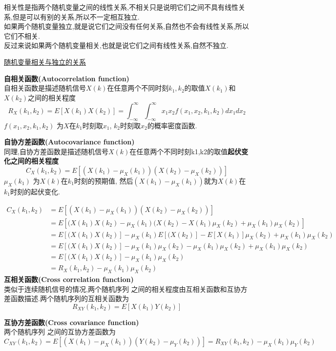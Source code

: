 \documentclass{article}
\begin{document}
相关性是指两个随机变量之间的线性关系,不相关只是说明它们之间不具有线性关系,但是可以有别的关系,所以不一定相互独立.\\
如果两个随机变量独立,就是说它们之间没有任何关系,自然也不会有线性关系,所以它们不相关.\\
反过来说如果两个随机变量相关,也就是说它们之间有线性关系,自然不独立.

\href{http://www.cppblog.com/sosi/archive/2010/09/20/127151.html}{随机变量相关与独立的关系}

\textbf{自相关函数(Autocorrelation function)}\\
自相关函数是描述随机信号$X(k)$在任意两个不同时刻$k_1,k_2$的取值$X(k_1) $和$X(k_2) $之间的相关程度
$$
R_X(k_1, k_2)
= E[X(k_1) X(k_2)]
= \int_{-\infty}^{\infty} \int_{-\infty}^{\infty} x_1 x_2 f(x_1, x_2, k_1, k_2)dx_1 dx_2
$$
$f(x_1, x_2, k_1, k_2)$ 为$X$在$k_1$时刻取$x_1$, $k_2$时刻取$x_2$的概率密度函数.

\textbf{自协方差函数(Autocovariance function)}\\
同理,自协方差函数是描述随机信号$X(k)$在任意两个不同时刻k1,k2的取值\textbf{起伏变化之间的相关程度}
$$ C_X(k_1,k_2) = E[(X(k_1) - \mu_X(k_1)) (X(k_2) - \mu_X(k_2))] $$
$\mu_X(k_1)$ 为$X(k)$在$k_1$时刻的预期值, 然后$(X(k_1) - \mu_X(k_1))$就为$X(k)$在$k_1$时刻的起伏变化.

$$
\begin{aligned}
C_X(k_1,k_2)
& = E[(X(k_1) - \mu_X(k_1)) (X(k_2) - \mu_X(k_2))] \\
& = E[(X(k_1) X(k_2) - \mu_X(k_1)(X(k_2) - X(k_1)\mu_X(k_2) + \mu_X(k_1) \mu_X(k_2)] \\
& = E[(X(k_1) X(k_2)] - \mu_X(k_1)E[(X(k_2)] - E[X(k_1)]\mu_X(k_2) + \mu_X(k_1) \mu_X(k_2) \\
& = E[(X(k_1) X(k_2)] - \mu_X(k_1) \mu_X(k_2) - \mu_X(k_1) \mu_X(k_2) + \mu_X(k_1) \mu_X(k_2) \\
& = E[(X(k_1) X(k_2)] - \mu_X(k_1) \mu_X(k_2)\\
& = R_X(k_1, k_2) - \mu_X(k_1) \mu_X(k_2)
\end{aligned}
$$
\textbf{互相关函数(Cross correlation function)}\\
类似于连续随机信号的情况,两个随机序列 之间的相关程度由互相关函数和互协方差函数描述.两个随机序列的互相关函数为
$$ R_{XY}(k_1, k_2) = E[X(k_1) Y(k_2)]$$

\textbf{互协方差函数(Cross covariance function)}\\
两个随机序列 之间的互协方差函数为
$$ C_{XY}(k_1,k_2) = E[(X(k_1) - \mu_X(k_1)) (Y(k_2) - \mu_Y(k_2))] = R_{XY}(k_1,k_2) - \mu_X(k_1) \mu_Y(k_2) $$
\end{document}

